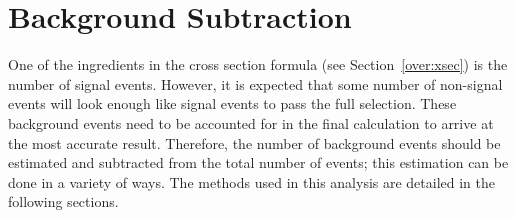 





\section{Background Subtraction}
\label{anMeth:BGSub}
One of the ingredients in the cross section formula 
(see Section~\ref{over:xsec}) 
is the number of signal events.  
However, it is expected that some number of non-signal events %
will look enough like signal events to pass the full selection.  
These background events need to be accounted for 
in the final calculation to arrive 
at the most accurate result.  
Therefore, the number of background events should 
be estimated and subtracted from the total number 
of events; 
this estimation can be done in a variety of ways.  
The methods used in this analysis are detailed 
in the following sections.  




